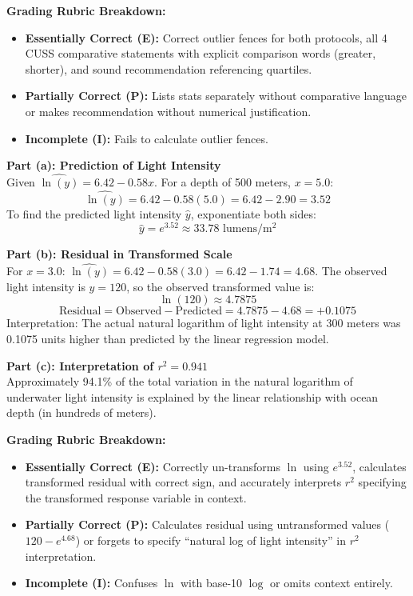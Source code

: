 \begin{frqrubricbox}
\textbf{Grading Rubric Breakdown:}\\
\begin{itemize}
  \item \textbf{Essentially Correct (E):} Correct outlier fences for both protocols, all 4 CUSS comparative statements with explicit comparison words (greater, shorter), and sound recommendation referencing quartiles.
  \item \textbf{Partially Correct (P):} Lists stats separately without comparative language or makes recommendation without numerical justification.
  \item \textbf{Incomplete (I):} Fails to calculate outlier fences.
\end{itemize}
\end{frqrubricbox}

\begin{frqrubricbox}
\textbf{Part (a): Prediction of Light Intensity}\\
Given $\widehat{\ln(y)} = 6.42 - 0.58x$. For a depth of 500 meters, $x = 5.0$:
\[ \widehat{\ln(y)} = 6.42 - 0.58(5.0) = 6.42 - 2.90 = 3.52 \]
To find the predicted light intensity $\hat{y}$, exponentiate both sides:
\[ \hat{y} = e^{3.52} \approx 33.78\text{ lumens/}\text{m}^2 \]

\textbf{Part (b): Residual in Transformed Scale}\\
For $x = 3.0$: $\widehat{\ln(y)} = 6.42 - 0.58(3.0) = 6.42 - 1.74 = 4.68$.
The observed light intensity is $y = 120$, so the observed transformed value is:
\[ \ln(120) \approx 4.7875 \]
\[ \text{Residual} = \text{Observed} - \text{Predicted} = 4.7875 - 4.68 = +0.1075 \]
Interpretation: The actual natural logarithm of light intensity at 300 meters was 0.1075 units higher than predicted by the linear regression model.

\textbf{Part (c): Interpretation of $r^2 = 0.941$}\\
Approximately 94.1\% of the total variation in the natural logarithm of underwater light intensity is explained by the linear relationship with ocean depth (in hundreds of meters).

\textbf{Grading Rubric Breakdown:}\\
\begin{itemize}
  \item \textbf{Essentially Correct (E):} Correctly un-transforms $\ln$ using $e^{3.52}$, calculates transformed residual with correct sign, and accurately interprets $r^2$ specifying the transformed response variable in context.
  \item \textbf{Partially Correct (P):} Calculates residual using untransformed values ($120 - e^{4.68}$) or forgets to specify ``natural log of light intensity'' in $r^2$ interpretation.
  \item \textbf{Incomplete (I):} Confuses $\ln$ with base-10 $\log$ or omits context entirely.
\end{itemize}
\end{frqrubricbox}

